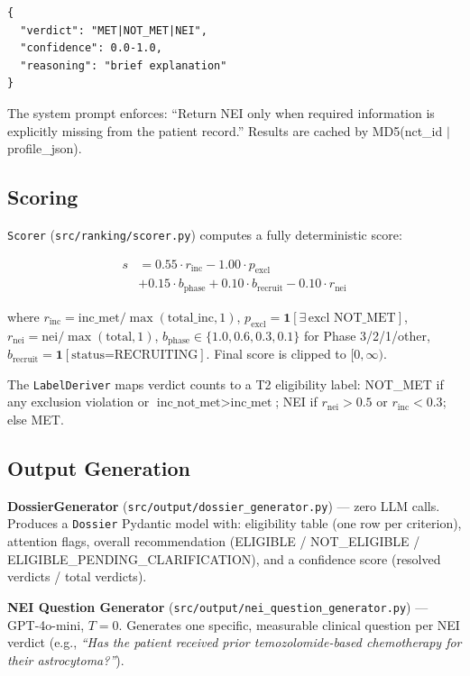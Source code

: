 \documentclass[10pt,twocolumn]{article}
\begin{document}
\begin{lstlisting}
{
  "verdict": "MET|NOT_MET|NEI",
  "confidence": 0.0-1.0,
  "reasoning": "brief explanation"
}
\end{lstlisting}

The system prompt enforces: ``Return NEI only when required information is explicitly
missing from the patient record.'' Results are cached by MD5(nct\_id $|$ profile\_json).

\subsection{Scoring}

\texttt{Scorer} (\texttt{src/ranking/scorer.py}) computes a fully deterministic score:

\begin{align}
s &= 0.55 \cdot r_{\text{inc}} - 1.00 \cdot p_{\text{excl}} \nonumber\\
  &+ 0.15 \cdot b_{\text{phase}} + 0.10 \cdot b_{\text{recruit}} - 0.10 \cdot r_{\text{nei}}
\end{align}

\noindent where $r_{\text{inc}} = \text{inc\_met} / \max(\text{total\_inc}, 1)$,
$p_{\text{excl}} = \mathbf{1}[\exists\, \text{excl NOT\_MET}]$,
$r_{\text{nei}} = \text{nei} / \max(\text{total}, 1)$,
$b_{\text{phase}} \in \{1.0, 0.6, 0.3, 0.1\}$ for Phase 3/2/1/other,
$b_{\text{recruit}} = \mathbf{1}[\text{status=RECRUITING}]$.
Final score is clipped to $[0, \infty)$.

The \texttt{LabelDeriver} maps verdict counts to a T2 eligibility label:
NOT\_MET if any exclusion violation or $\text{inc\_not\_met} > \text{inc\_met}$;
NEI if $r_{\text{nei}} > 0.5$ or $r_{\text{inc}} < 0.3$; else MET.

\subsection{Output Generation}

\textbf{DossierGenerator} (\texttt{src/output/dossier\_generator.py}) — zero LLM calls.
Produces a \texttt{Dossier} Pydantic model with: eligibility table (one row per criterion),
attention flags, overall recommendation (ELIGIBLE / NOT\_ELIGIBLE / ELIGIBLE\_PENDING\_CLARIFICATION),
and a confidence score (resolved verdicts / total verdicts).

\textbf{NEI Question Generator} (\texttt{src/output/nei\_question\_generator.py}) — GPT-4o-mini,
$T{=}0$. Generates one specific, measurable clinical question per NEI verdict (e.g.,
\textit{``Has the patient received prior temozolomide-based chemotherapy for their astrocytoma?''}).
\end{document}
